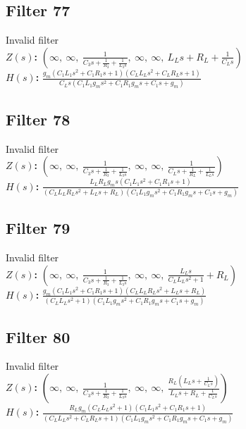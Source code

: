 \documentclass{article}
\begin{document}
\subsection*{Filter 77}
Invalid filter \\ 
\textbf{$Z(s)$:} $\left( \infty, \  \infty, \  \frac{1}{C_{3} s + \frac{1}{R_{3}} + \frac{1}{L_{3} s}}, \  \infty, \  \infty, \  L_{L} s + R_{L} + \frac{1}{C_{L} s}\right)$ \\ 
\textbf{$H(s)$:} $\frac{g_{m} \left(C_{1} L_{1} s^{2} + C_{1} R_{1} s + 1\right) \left(C_{L} L_{L} s^{2} + C_{L} R_{L} s + 1\right)}{C_{L} s \left(C_{1} L_{1} g_{m} s^{2} + C_{1} R_{1} g_{m} s + C_{1} s + g_{m}\right)}$ \\ 
\subsection*{Filter 78}
Invalid filter \\ 
\textbf{$Z(s)$:} $\left( \infty, \  \infty, \  \frac{1}{C_{3} s + \frac{1}{R_{3}} + \frac{1}{L_{3} s}}, \  \infty, \  \infty, \  \frac{1}{C_{L} s + \frac{1}{R_{L}} + \frac{1}{L_{L} s}}\right)$ \\ 
\textbf{$H(s)$:} $\frac{L_{L} R_{L} g_{m} s \left(C_{1} L_{1} s^{2} + C_{1} R_{1} s + 1\right)}{\left(C_{L} L_{L} R_{L} s^{2} + L_{L} s + R_{L}\right) \left(C_{1} L_{1} g_{m} s^{2} + C_{1} R_{1} g_{m} s + C_{1} s + g_{m}\right)}$ \\ 
\subsection*{Filter 79}
Invalid filter \\ 
\textbf{$Z(s)$:} $\left( \infty, \  \infty, \  \frac{1}{C_{3} s + \frac{1}{R_{3}} + \frac{1}{L_{3} s}}, \  \infty, \  \infty, \  \frac{L_{L} s}{C_{L} L_{L} s^{2} + 1} + R_{L}\right)$ \\ 
\textbf{$H(s)$:} $\frac{g_{m} \left(C_{1} L_{1} s^{2} + C_{1} R_{1} s + 1\right) \left(C_{L} L_{L} R_{L} s^{2} + L_{L} s + R_{L}\right)}{\left(C_{L} L_{L} s^{2} + 1\right) \left(C_{1} L_{1} g_{m} s^{2} + C_{1} R_{1} g_{m} s + C_{1} s + g_{m}\right)}$ \\ 
\subsection*{Filter 80}
Invalid filter \\ 
\textbf{$Z(s)$:} $\left( \infty, \  \infty, \  \frac{1}{C_{3} s + \frac{1}{R_{3}} + \frac{1}{L_{3} s}}, \  \infty, \  \infty, \  \frac{R_{L} \left(L_{L} s + \frac{1}{C_{L} s}\right)}{L_{L} s + R_{L} + \frac{1}{C_{L} s}}\right)$ \\ 
\textbf{$H(s)$:} $\frac{R_{L} g_{m} \left(C_{L} L_{L} s^{2} + 1\right) \left(C_{1} L_{1} s^{2} + C_{1} R_{1} s + 1\right)}{\left(C_{L} L_{L} s^{2} + C_{L} R_{L} s + 1\right) \left(C_{1} L_{1} g_{m} s^{2} + C_{1} R_{1} g_{m} s + C_{1} s + g_{m}\right)}$ \\ 
\end{document}
